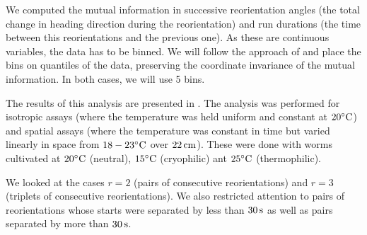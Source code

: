 \documentclass[12pt]{article}
\begin{document}
We computed the mutual information in successive reorientation angles (the total change in heading direction during the reorientation)  and run durations (the time between this reorientations and the previous one). As these are continuous variables, the data has to be binned. We will follow the approach of \cite{Slonim:2005} and place the bins on quantiles of the data, preserving the coordinate invariance of the mutual information. In both cases, we will use 5 bins.


The results of this analysis are presented in . The analysis was performed for isotropic assays (where the temperature was held uniform and constant at $20^\circ\mathrm{C}$) and spatial assays (where the temperature was constant in time but varied linearly in space from $18-23^\circ\mathrm{C}$ over $22\,\mathrm{cm}$). These were done with worms cultivated at $20^\circ\mathrm{C}$ (neutral), $15^\circ\mathrm{C}$ (cryophilic) ant $25^\circ\mathrm{C}$ (thermophilic).

We looked at the cases $r=2$ (pairs of consecutive reorientations) and $r=3$ (triplets of consecutive reorientations). We also restricted attention to pairs of reorientations whose starts were separated by less than $30\,\mathrm{s}$ as well as pairs separated by more than $30\,\mathrm{s}$.

\end{document}
